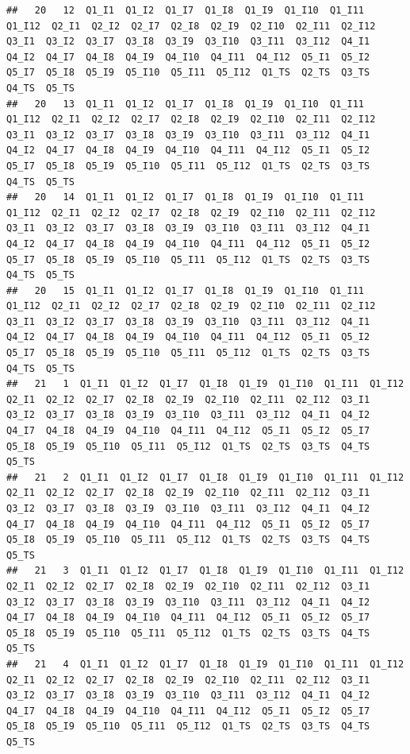 \documentclass[]{book}
\begin{document}
\begin{verbatim}
##   20   12  Q1_I1  Q1_I2  Q1_I7  Q1_I8  Q1_I9  Q1_I10  Q1_I11  Q1_I12  Q2_I1  Q2_I2  Q2_I7  Q2_I8  Q2_I9  Q2_I10  Q2_I11  Q2_I12  Q3_I1  Q3_I2  Q3_I7  Q3_I8  Q3_I9  Q3_I10  Q3_I11  Q3_I12  Q4_I1  Q4_I2  Q4_I7  Q4_I8  Q4_I9  Q4_I10  Q4_I11  Q4_I12  Q5_I1  Q5_I2  Q5_I7  Q5_I8  Q5_I9  Q5_I10  Q5_I11  Q5_I12  Q1_TS  Q2_TS  Q3_TS  Q4_TS  Q5_TS
##   20   13  Q1_I1  Q1_I2  Q1_I7  Q1_I8  Q1_I9  Q1_I10  Q1_I11  Q1_I12  Q2_I1  Q2_I2  Q2_I7  Q2_I8  Q2_I9  Q2_I10  Q2_I11  Q2_I12  Q3_I1  Q3_I2  Q3_I7  Q3_I8  Q3_I9  Q3_I10  Q3_I11  Q3_I12  Q4_I1  Q4_I2  Q4_I7  Q4_I8  Q4_I9  Q4_I10  Q4_I11  Q4_I12  Q5_I1  Q5_I2  Q5_I7  Q5_I8  Q5_I9  Q5_I10  Q5_I11  Q5_I12  Q1_TS  Q2_TS  Q3_TS  Q4_TS  Q5_TS
##   20   14  Q1_I1  Q1_I2  Q1_I7  Q1_I8  Q1_I9  Q1_I10  Q1_I11  Q1_I12  Q2_I1  Q2_I2  Q2_I7  Q2_I8  Q2_I9  Q2_I10  Q2_I11  Q2_I12  Q3_I1  Q3_I2  Q3_I7  Q3_I8  Q3_I9  Q3_I10  Q3_I11  Q3_I12  Q4_I1  Q4_I2  Q4_I7  Q4_I8  Q4_I9  Q4_I10  Q4_I11  Q4_I12  Q5_I1  Q5_I2  Q5_I7  Q5_I8  Q5_I9  Q5_I10  Q5_I11  Q5_I12  Q1_TS  Q2_TS  Q3_TS  Q4_TS  Q5_TS
##   20   15  Q1_I1  Q1_I2  Q1_I7  Q1_I8  Q1_I9  Q1_I10  Q1_I11  Q1_I12  Q2_I1  Q2_I2  Q2_I7  Q2_I8  Q2_I9  Q2_I10  Q2_I11  Q2_I12  Q3_I1  Q3_I2  Q3_I7  Q3_I8  Q3_I9  Q3_I10  Q3_I11  Q3_I12  Q4_I1  Q4_I2  Q4_I7  Q4_I8  Q4_I9  Q4_I10  Q4_I11  Q4_I12  Q5_I1  Q5_I2  Q5_I7  Q5_I8  Q5_I9  Q5_I10  Q5_I11  Q5_I12  Q1_TS  Q2_TS  Q3_TS  Q4_TS  Q5_TS
##   21   1  Q1_I1  Q1_I2  Q1_I7  Q1_I8  Q1_I9  Q1_I10  Q1_I11  Q1_I12  Q2_I1  Q2_I2  Q2_I7  Q2_I8  Q2_I9  Q2_I10  Q2_I11  Q2_I12  Q3_I1  Q3_I2  Q3_I7  Q3_I8  Q3_I9  Q3_I10  Q3_I11  Q3_I12  Q4_I1  Q4_I2  Q4_I7  Q4_I8  Q4_I9  Q4_I10  Q4_I11  Q4_I12  Q5_I1  Q5_I2  Q5_I7  Q5_I8  Q5_I9  Q5_I10  Q5_I11  Q5_I12  Q1_TS  Q2_TS  Q3_TS  Q4_TS  Q5_TS
##   21   2  Q1_I1  Q1_I2  Q1_I7  Q1_I8  Q1_I9  Q1_I10  Q1_I11  Q1_I12  Q2_I1  Q2_I2  Q2_I7  Q2_I8  Q2_I9  Q2_I10  Q2_I11  Q2_I12  Q3_I1  Q3_I2  Q3_I7  Q3_I8  Q3_I9  Q3_I10  Q3_I11  Q3_I12  Q4_I1  Q4_I2  Q4_I7  Q4_I8  Q4_I9  Q4_I10  Q4_I11  Q4_I12  Q5_I1  Q5_I2  Q5_I7  Q5_I8  Q5_I9  Q5_I10  Q5_I11  Q5_I12  Q1_TS  Q2_TS  Q3_TS  Q4_TS  Q5_TS
##   21   3  Q1_I1  Q1_I2  Q1_I7  Q1_I8  Q1_I9  Q1_I10  Q1_I11  Q1_I12  Q2_I1  Q2_I2  Q2_I7  Q2_I8  Q2_I9  Q2_I10  Q2_I11  Q2_I12  Q3_I1  Q3_I2  Q3_I7  Q3_I8  Q3_I9  Q3_I10  Q3_I11  Q3_I12  Q4_I1  Q4_I2  Q4_I7  Q4_I8  Q4_I9  Q4_I10  Q4_I11  Q4_I12  Q5_I1  Q5_I2  Q5_I7  Q5_I8  Q5_I9  Q5_I10  Q5_I11  Q5_I12  Q1_TS  Q2_TS  Q3_TS  Q4_TS  Q5_TS
##   21   4  Q1_I1  Q1_I2  Q1_I7  Q1_I8  Q1_I9  Q1_I10  Q1_I11  Q1_I12  Q2_I1  Q2_I2  Q2_I7  Q2_I8  Q2_I9  Q2_I10  Q2_I11  Q2_I12  Q3_I1  Q3_I2  Q3_I7  Q3_I8  Q3_I9  Q3_I10  Q3_I11  Q3_I12  Q4_I1  Q4_I2  Q4_I7  Q4_I8  Q4_I9  Q4_I10  Q4_I11  Q4_I12  Q5_I1  Q5_I2  Q5_I7  Q5_I8  Q5_I9  Q5_I10  Q5_I11  Q5_I12  Q1_TS  Q2_TS  Q3_TS  Q4_TS  Q5_TS

\end{verbatim}
\end{document}
